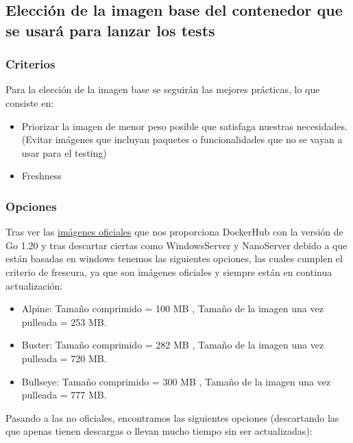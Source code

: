 \subsection{Elección de la imagen base del contenedor que se usará para lanzar los tests}

\subsubsection{Criterios}

Para la elección de la imagen base se seguirán las mejores prácticas, lo
que consiste en:

\begin{itemize}
\item
  Priorizar la imagen de menor peso posible que satisfaga nuestras
  necesidades. (Evitar imágenes que incluyan paquetes o funcionalidades
  que no se vayan a usar para el testing)
\item
  Freshness
\end{itemize}

\subsubsection{Opciones}

Tras ver las \href{https://hub.docker.com/_/golang}{imágenes oficiales}
que nos proporciona DockerHub con la versión de Go 1.20 y tras descartar
ciertas como WindowsServer y NanoServer debido a que están basadas en
windows tenemos las siguientes opciones, las cuales cumplen el criterio
de frescura, ya que son imágenes oficiales y siempre están en continua
actualización:

\begin{itemize}
\item
  Alpine: Tamaño comprimido = 100 MB , Tamaño de la imagen una vez
  pulleada = 253 MB.
\item
  Buster: Tamaño comprimido = 282 MB , Tamaño de la imagen una vez
  pulleada = 720 MB.
\item
  Bullseye: Tamaño comprimido = 300 MB , Tamaño de la imagen una vez
  pulleada = 777 MB.
\end{itemize}

Pasando a las no oficiales, encontramos las siguientes opciones
(descartando las que apenas tienen descargas o llevan mucho tiempo sin
ser actualizadas):

